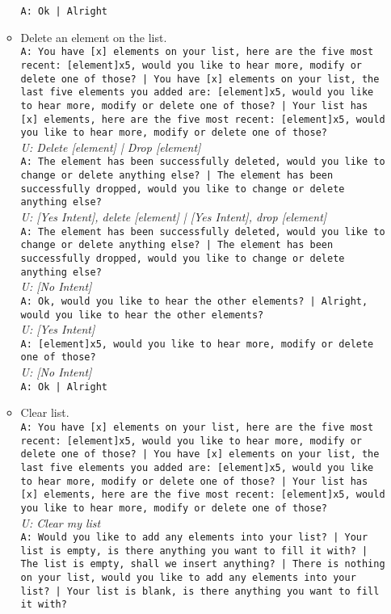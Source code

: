 \begin{itemize}
\begin{itemize}
		\texttt{A: Ok | Alright}
		\item Delete an element on the list.\\	
		\texttt{A: You have [x] elements on your list, here are the five most recent: [element]x5, would you like to hear more, modify or delete one of those? | You have [x] elements on your list, the last five elements you added are: [element]x5, would you like to hear more, modify or delete one of those? | Your list has [x] elements, here are the five most recent: [element]x5, would you like to hear more, modify or delete one of those?}\\
		\textit{U: Delete [element] | Drop [element]}\\
		\texttt{A: The element has been successfully deleted, would you like to change or delete anything else? | The element has been successfully dropped, would you like to change or delete anything else?}\\
		\textit{U: [Yes Intent], delete [element] | [Yes Intent], drop [element]}\\
		\texttt{A: The element has been successfully deleted, would you like to change or delete anything else? | The element has been successfully dropped, would you like to change or delete anything else?}\\
		\textit{U: [No Intent]}\\
		\texttt{A: Ok, would you like to hear the other elements? | Alright, would you like to hear the other elements? }\\
		\textit{U: [Yes Intent] }\\
		\texttt{A: [element]x5, would you like to hear more, modify or delete one of those?}\\
		\textit{U: [No Intent]}\\
		\texttt{A: Ok | Alright}
		\item Clear list.\\
		\texttt{A: You have [x] elements on your list, here are the five most recent: [element]x5, would you like to hear more, modify or delete one of those? | You have [x] elements on your list, the last five elements you added are: [element]x5, would you like to hear more, modify or delete one of those? | Your list has [x] elements, here are the five most recent: [element]x5, would you like to hear more, modify or delete one of those?}\\
		\textit{U: Clear my list}\\
		\texttt{A: Would you like to add any elements into your list? | Your list is empty, is there anything you want to fill it with? | The list is empty, shall we insert anything? | There is nothing on your list, would you like to add any elements into your list? | Your list is blank, is there anything you want to fill it with?}\\

\end{itemize}
\end{itemize}
